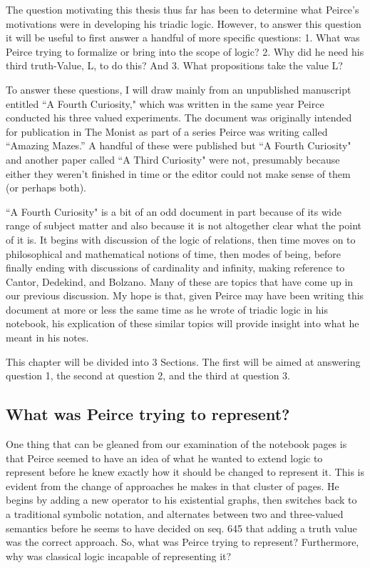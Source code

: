\documentclass[12pt]{article}
\begin{document}
The question motivating this thesis thus far has been to determine what Peirce's motivations were in developing his triadic logic. However, to answer this question it will be useful to first answer a handful of more specific questions: 1. What was Peirce trying to formalize or bring into the scope of logic? 2. Why did he need his third truth-Value, L, to do this? And 3. What propositions take the value L? 

To answer these questions, I will draw mainly from an unpublished manuscript entitled ``A Fourth Curiosity," which was written in the same year Peirce conducted his three valued experiments. The document was originally intended for publication in The Monist as part of a series Peirce was writing called ``Amazing Mazes.” A handful of these were published but ``A Fourth Curiosity" and another paper called ``A Third Curiosity" were not, presumably because either they weren't finished in time or the editor could not make sense of them (or perhaps both). 

``A Fourth Curiosity" is a bit of an odd document in part because of its wide range of subject matter and also because it is not altogether clear what the point of it is. It begins with discussion of the logic of relations, then time moves on to philosophical and mathematical notions of time, then modes of being, before finally ending with discussions of cardinality and infinity, making reference to Cantor, Dedekind, and Bolzano. Many of these are topics that have come up in our previous discussion. My hope is that, given Peirce may have been writing this document at more or less the same time as he wrote of triadic logic in his notebook, his explication of these similar topics will provide insight into what he meant in his notes. 

This chapter will be divided into 3 Sections. The first will be aimed at answering question 1, the second at question 2, and the third at question 3.

\subsection{What was Peirce trying to represent?}

One thing that can be gleaned from our examination of the notebook pages is that Peirce seemed to have an idea of what he wanted to extend logic to represent before he knew exactly how it should be changed to represent it. This is evident from the change of approaches he makes in that cluster of pages. He begins by adding a new operator to his existential graphs, then switches back to a traditional symbolic notation, and alternates between two and three-valued semantics before he seems to have decided on seq. 645 that adding a truth value was the correct approach. So, what was Peirce trying to represent? Furthermore, why was classical logic incapable of representing it?
\end{document}
